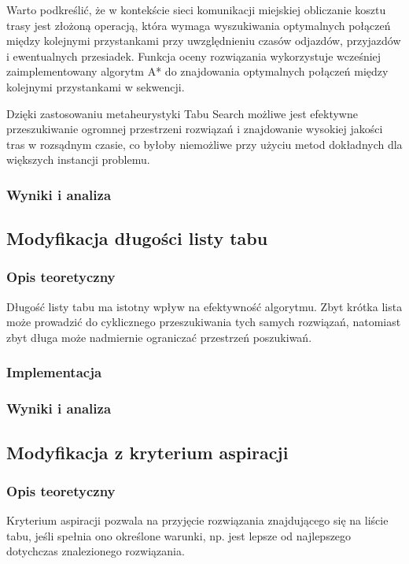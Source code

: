 \documentclass[12pt,a4paper]{article}
\begin{document}
Warto podkreślić, że w kontekście sieci komunikacji miejskiej obliczanie kosztu trasy jest złożoną operacją, która wymaga wyszukiwania optymalnych połączeń między kolejnymi przystankami przy uwzględnieniu czasów odjazdów, przyjazdów i ewentualnych przesiadek. Funkcja oceny rozwiązania wykorzystuje wcześniej zaimplementowany algorytm A* do znajdowania optymalnych połączeń między kolejnymi przystankami w sekwencji.

Dzięki zastosowaniu metaheurystyki Tabu Search możliwe jest efektywne przeszukiwanie ogromnej przestrzeni rozwiązań i znajdowanie wysokiej jakości tras w rozsądnym czasie, co byłoby niemożliwe przy użyciu metod dokładnych dla większych instancji problemu.

\subsubsection{Wyniki i analiza}

\subsection{Modyfikacja długości listy tabu}
\subsubsection{Opis teoretyczny}
Długość listy tabu ma istotny wpływ na efektywność algorytmu. Zbyt krótka lista może prowadzić do cyklicznego przeszukiwania tych samych rozwiązań, natomiast zbyt długa może nadmiernie ograniczać przestrzeń poszukiwań.

\subsubsection{Implementacja}

\subsubsection{Wyniki i analiza}

\subsection{Modyfikacja z kryterium aspiracji}
\subsubsection{Opis teoretyczny}
Kryterium aspiracji pozwala na przyjęcie rozwiązania znajdującego się na liście tabu, jeśli spełnia ono określone warunki, np. jest lepsze od najlepszego dotychczas znalezionego rozwiązania.
\end{document}
